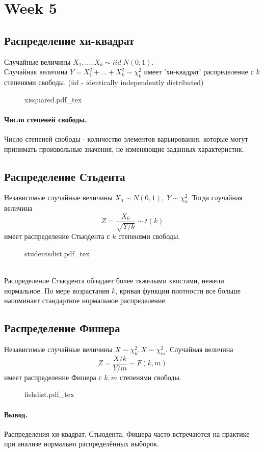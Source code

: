 \documentclass{article}
\newcommand{\incfig}[2][1]{%
    \def\svgwidth{#1\columnwidth}
    {#2.pdf_tex}
}
\begin{document}
\section{Week 5}
\subsection{Распределение хи-квадрат}
Случайные величины $X_1,...,X_k \sim iid \; N(0,1).$
\\
Случайная величина $Y=X_1^2 + ... + X_k^2 \sim \chi_k^2$ имеет 'хи-квадрат' распределение с $k$ степенями свободы. (iid - identically independently distributed)
\begin{figure}[h!]
  \centering
  \incfig{xisquared}
\end{figure}
\paragraph{Число степеней свободы.}
Число степеней свободы - количество элементов варьирования, которые могут принимать произвольные значения, не изменяющие заданных характеристик.
\subsection{Распределение Стьдента}
Независимые случайные величины $X_0 \sim N(0,1), \; Y\sim \chi_k^2$. Тогда случайная величина
\[
Z=\frac{X_0}{\sqrt{Y/k}} \sim t(k)
\]
имеет распределение Стьюдента с $k$ степенями свободы.
\begin{figure}[h!]
  \centering
  \incfig{studentsdist}
\end{figure}
\\
Распределение Стьюдента обладает более тяжелыми хвостами, нежели нормальное. По мере возрастания $k$, кривая функции плотности все больше напоминает стандартное нормальное распределение.
\subsection{Распределение Фишера}
Независимые случайные величины $X\sim \chi_k^2,X\sim \chi_m^2$. Случайная величина
\[
Z = \frac{X/k}{Y/m} \sim F(k,m)
\]
имеет распределение Фишера с $k,m$ степенями свободы.
\begin{figure}[h!]
  \centering
  \incfig{fishdist}
\end{figure}
\paragraph{Вывод.}
Распределения хи-квадрат, Стьюдента, Фишера часто встречаются на практике при анализе нормально распределённых выборок.
\end{document}
